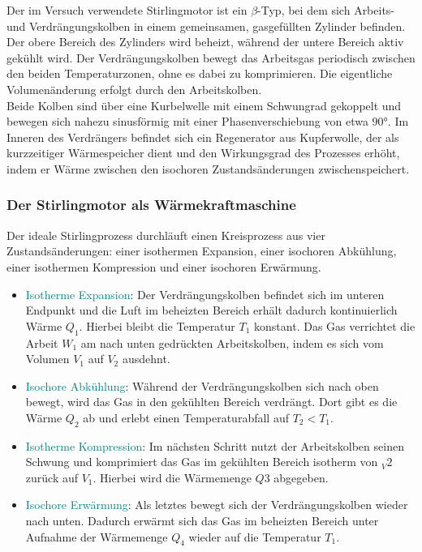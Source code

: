 Der im Versuch verwendete Stirlingmotor ist ein \(\beta\)-Typ, bei dem sich Arbeits- und Verdrängungskolben in einem gemeinsamen, gasgefüllten Zylinder befinden. Der obere Bereich des Zylinders wird beheizt, während der untere Bereich aktiv gekühlt wird. Der Verdrängungskolben bewegt das Arbeitsgas periodisch zwischen den beiden Temperaturzonen, ohne es dabei zu komprimieren. Die eigentliche Volumenänderung erfolgt durch den Arbeitskolben.\\
Beide Kolben sind über eine Kurbelwelle mit einem Schwungrad gekoppelt und bewegen sich nahezu sinusförmig mit einer Phasenverschiebung von etwa \(\ang{90}\). Im Inneren des Verdrängers befindet sich ein Regenerator aus Kupferwolle, der als kurzzeitiger Wärmespeicher dient und den Wirkungsgrad des Prozesses erhöht, indem er Wärme zwischen den isochoren Zustandsänderungen zwischenspeichert.
\subsubsection{Der Stirlingmotor als Wärmekraftmaschine} \label{ssec:SterWa}
Der ideale Stirlingprozess durchläuft einen Kreisprozess aus vier Zustandsänderungen: einer isothermen Expansion, einer isochoren Abkühlung, einer isothermen Kompression und einer isochoren Erwärmung.

\begin{itemize}[noitemsep]
    \item \textcolor{teal}{Isotherme Expansion}: Der Verdrängungskolben befindet sich im unteren Endpunkt und die Luft im beheizten Bereich erhält dadurch kontinuierlich Wärme \(Q_1\). Hierbei bleibt die Temperatur \(T_1\) konstant. Das Gas verrichtet die Arbeit \(W_1\) am nach unten gedrückten Arbeitskolben, indem es sich vom Volumen \(V_1\) auf \(V_2\) ausdehnt.
    \item \textcolor{teal}{Isochore Abkühlung}: Während der Verdrängungskolben sich nach oben bewegt, wird das Gas in den gekühlten Bereich verdrängt. Dort gibt es die Wärme \(Q_2\) ab und erlebt einen Temperaturabfall auf \(T_2 < T_1\).
    \item \textcolor{teal}{Isotherme Kompression}: Im nächsten Schritt nutzt der Arbeitskolben seinen Schwung und komprimiert das Gas im gekühlten Bereich isotherm von \(_V2\) zurück auf \(V_1\). Hierbei wird die Wärmemenge \(Q3\) abgegeben.
    \item \textcolor{teal}{Isochore Erwärmung}: Als letztes bewegt sich der Verdrängungskolben wieder nach unten. Dadurch erwärmt sich das Gas im beheizten Bereich unter Aufnahme der Wärmemenge \(Q_4\) wieder auf die Temperatur \(T_1\).
\end{itemize}


